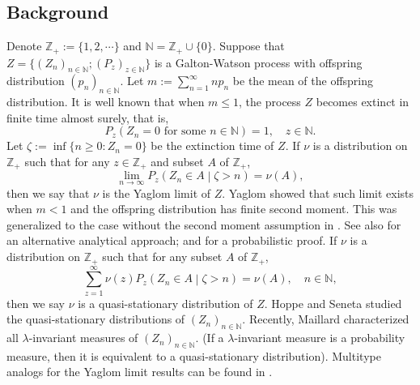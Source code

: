 \documentclass[12pt,a4paper]{amsart}
\numberwithin{equation}{section}
\theoremstyle{plain}
\theoremstyle{definition}
\theoremstyle{remark}
\begin{document}
\subsection{Background}\label{sec:BGD}
	Denote $\mathbb Z_+:= \{1,2,\cdots\}$ and $\mathbb N = \mathbb Z_+ \cup \{0\}$. %
	Suppose that $Z=\{(Z_n)_{n\in \mathbb N}; (P_z)_{z\in \mathbb N}\}$ 
	is a Galton-Watson process with offspring distribution
		$(p_n)_{n\in \mathbb N}$.
	Let $m:=\sum^{\infty}_{n=1}np_n$ be the mean
	of the offspring distribution.
	It is well known that when $m\leq 1$,
	the process $Z$ becomes extinct in finite time almost surely, that is,
\[
	P_z(Z_n = 0 \text{ for some $n \in \mathbb N$} ) = 1, \quad z \in \mathbb N.
\]
	Let $\zeta:=\inf\{n\geq 0: Z_n=0\}$ be the extinction time of $Z$.
	If $\nu$ is a distribution on %
	$\mathbb Z_+$ such that for any $z\in \mathbb Z_+$ and subset $A$ of $\mathbb Z_+$, %
\[
	\lim_{n\rightarrow\infty} P_z\left(Z_n\in A\middle|\zeta>n \right)=\nu(A), %
\]
	then we say that $\nu$ is the Yaglom limit of $Z$.
	Yaglom \cite{Yaglom47} showed that such limit exists when $m < 1$ and the offspring distribution has finite second moment.
	This was generalized to the case without the second moment assumption
	in \cite{Heathcote, Joffe1967On}.
	See also \cite[pp. 64--65]{AthreyaNey1972Branching} for an alternative analytical approach; and \cite{LyonsPemantlePeres1995Conceptual} for a probabilistic proof.
	If $\nu$ is a distribution on $\mathbb Z_+$ such that for any subset $A$ of $\mathbb Z_+$,
\[
	\sum_{z = 1}^\infty \nu(z) P_z\left(Z_n\in A\middle|\zeta>n \right) 
	=\nu(A), \quad n \in \mathbb N,
\]
	then we say $\nu$ is a quasi-stationary distribution %
	of $Z$.
	Hoppe and Seneta \cite{HoppeSeneta1978Analytical} studied the quasi-stationary distributions of $(Z_n)_{n\in \mathbb N}$.
	Recently, Maillard \cite{Maillard2018The}
characterized all  $\lambda$-invariant measures of $(Z_n)_{n \in \mathbb N}$.
(If a $\lambda$-invariant measure is a probability measure, then it is equivalent to a quasi-stationary distribution).
	Multitype analogs for the Yaglom limit results can be found in
	\cite{Hoppe1975Stationary, HoppeSeneta1978Analytical, JoffeSpitzer1967On}.
\end{document}
